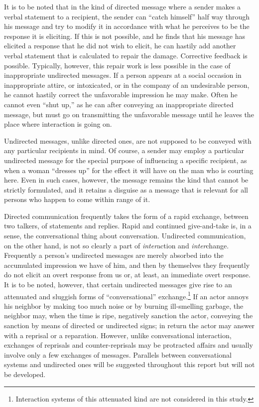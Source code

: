 \documentclass[openany,nobib]{tufte-book}
\begin{document}
It is to be noted that in the kind of directed message where a sender
makes a verbal statement to a recipient, the sender can ``catch
himself'' half way through his message and try to modify it in
accordance with what he perceives to be the response it is eliciting. If
this is not possible, and he finds that his message has elicited a
response that he did not wish to elicit, he can hastily add another
verbal statement that is calculated to repair the damage. Corrective
feedback is possible. Typically, however, this repair work is less
possible in the case of inappropriate undirected messages. If a person
appears at a social occasion in inappropriate attire, or intoxicated, or
in the company of an undesirable person, he cannot hastily correct the
unfavorable impression he may make. Often he cannot even ``shut up,'' as
he can after conveying an inappropriate directed message, but must go on
transmitting the unfavorable message until he leaves the place where
interaction is going on.

Undirected messages, unlike directed ones, are not supposed to be
conveyed with any particular recipients in mind. Of course, a sender may
employ a particular undirected message for the special purpose of
influencing a specific recipient, as when a woman ``dresses up'' for the
effect it will have on the man who is courting here. Even in such cases,
however, the message remains the kind that cannot be strictly
formulated, and it retains a disguise as a message that is relevant for
all persons who happen to come within range of it.

Directed communication frequently takes the form of a rapid exchange,
between two talkers, of statements and replies. Rapid and continued
give-and-take is, in a sense, the conversational thing about
conversation. Undirected communication, on the other hand, is not so
clearly a part of \emph{inter}action and \emph{inter}change. Frequently
a person's undirected messages are merely absorbed into the accumulated
impression we have of him, and then by themselves they frequently do not
elicit an overt response from us or, at least, an immediate overt
response. It is to be noted, however, that certain undirected messages
give rise to an attenuated and sluggish forms of ``conversational''
exchange.\footnote{Interaction systems of this attenuated kind are not
  considered in this study.} If an actor annoys his neighbor by making
too much noise or by burning ill-smelling garbage, the neighbor may,
when the time is ripe, negatively sanction the actor, conveying the
sanction by means of directed or undirected signs; in return the actor
may answer with a reprisal or a reparation. However, unlike
conversational interaction, exchanges of reprisals and counter-reprisals
may be protracted affairs and usually involve only a few exchanges of
messages. Parallels between conversational systems and undirected ones
will be suggested throughout this report but will not be developed.
\end{document}
